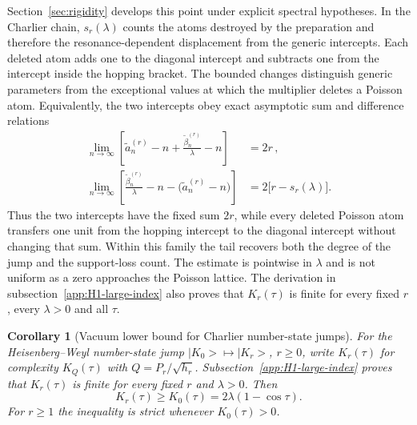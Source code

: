 \documentclass[a4paper,11pt]{article}
\def\ket#1{|#1>}%
\newtheorem{corollary}[proposition]{Corollary}
\theoremstyle{definition}
\theoremstyle{remark}
\newcommand{\ket}[1]{|#1\rangle}
\begin{document}
Section~\ref{sec:rigidity} develops this point under explicit spectral hypotheses.  In the
Charlier chain, $s_r(\lambda)$ counts the atoms destroyed by the preparation and therefore the
resonance-dependent displacement from the generic intercepts.  Each deleted atom adds one to the
diagonal intercept and subtracts one from the intercept inside the hopping bracket. The bounded
changes distinguish generic parameters from the exceptional values at which the multiplier deletes
a Poisson atom. Equivalently, the two intercepts obey exact asymptotic sum and difference
relations 
\begin{equation}
\begin{aligned}
   \lim_{n\to\infty}
   \left[
      \widetilde a_n^{(r)}-n
      +\frac{\widetilde\beta_n^{(r)}}{\lambda}-n
   \right]
   &=2r\,,\\
   \lim_{n\to\infty}
   \left[
      \frac{\widetilde\beta_n^{(r)}}{\lambda}-n
      -\bigl(\widetilde a_n^{(r)}-n\bigr)
   \right]
   &=2\bigl[r-s_r(\lambda)\bigr].
\end{aligned}
   \label{eq:H1-intercept-budget-main}
\end{equation}
Thus the two intercepts have the fixed sum $2r$, while every deleted Poisson atom
transfers one unit from the hopping intercept to the diagonal intercept without changing that sum.
Within this family the tail recovers both the degree of the jump and the support-loss count.
The estimate is pointwise in $\lambda$ and is not uniform as a zero approaches the
Poisson lattice. The derivation in subsection~\ref{app:H1-large-index} also proves that
$K_r(\tau)$ is finite for every fixed $r$, every $\lambda>0$ and all $\tau$.

\begin{corollary}[Vacuum lower bound for Charlier number-state jumps]
\label{cor:H1-monotonicity}
For the Heisenberg--Weyl number-state jump \(\ket{K_0}\mapsto\ket{K_r}\), \(r\ge0\), write \(K_{r}(\tau)\) for complexity \(K_Q(\tau)\) with \(Q=P_r/\sqrt{h_r}\). Subsection~\ref{app:H1-large-index} proves that $K_r(\tau)$ is finite for every fixed $r$ and $\lambda>0$. Then
\begin{equation}
   K_{r}(\tau)\ge K_0(\tau)=2\lambda(1-\cos\tau).
   \label{eq:H1-monotonicity}
\end{equation}
For \(r\ge1\) the inequality is strict whenever \(K_0(\tau)>0\).
\end{corollary}
\end{document}

